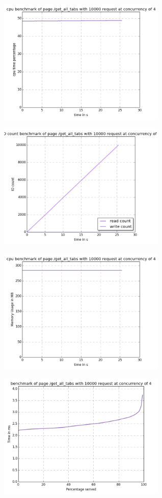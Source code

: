 \begin{center}
\includegraphics[width=0.6\textwidth]{img/get_all_tabs.cpu.png}



\includegraphics[width=0.6\textwidth]{img/get_all_tabs.io-count.png}



\includegraphics[width=0.6\textwidth]{img/get_all_tabs.mem.png}



\includegraphics[width=0.6\textwidth]{img/get_all_tabs.serv-time.png}




\end{center}
